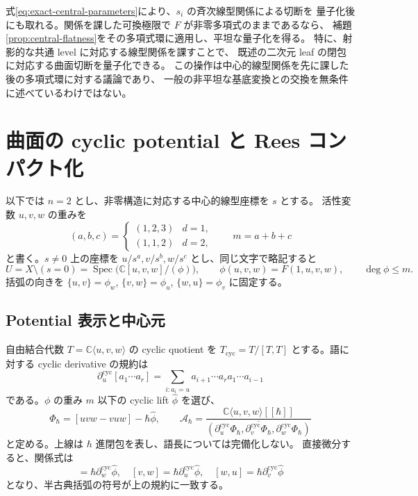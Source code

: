 式\eqref{eq:exact-central-parameters}により、$s_i$ の斉次線型関係による切断を
量子化後にも取れる。関係を課した可換極限で $F$ が非零多項式のままであるなら、
補題\ref{prop:central-flatness}をその多項式環に適用し、平坦な量子化を得る。
特に、射影的な共通 level に対応する線型関係を課すことで、
既述の二次元 leaf の閉包に対応する曲面切断を量子化できる。
この操作は中心的線型関係を先に課した後の多項式環に対する議論であり、
一般の非平坦な基底変換との交換を無条件に述べているわけではない。

\section{曲面の cyclic potential と Rees コンパクト化}
\label{sec:surface-potential}

以下では $n=2$ とし、非零構造に対応する中心的線型座標を $s$ とする。
活性変数 $u,v,w$ の重みを
\[
 (a,b,c)=
 \begin{cases}(1,2,3)&d=1,\\(1,1,2)&d=2,\end{cases}
 \qquad m=a+b+c
\]
と書く。$s\ne0$ 上の座標を $u/s^a,v/s^b,w/s^c$ とし、同じ文字で略記すると
\begin{equation}
 U=X\setminus(s=0)=\operatorname{Spec}\bigl(\mathbb C[u,v,w]/(\phi)\bigr),
 \qquad \phi(u,v,w)=F(1,u,v,w),\qquad \deg\phi\leq m.
 \label{eq:affine-surface}
\end{equation}
括弧の向きを
$\{u,v\}=\phi_w$, $\{v,w\}=\phi_u$, $\{w,u\}=\phi_v$ に固定する。

\subsection{Potential 表示と中心元}

自由結合代数 $T=\mathbb C\langle u,v,w\rangle$ の cyclic quotient を
$T_{\mathrm{cyc}}=T/[T,T]$ とする。語に対する cyclic derivative の規約は
\begin{equation}
 \partial_u^{\mathrm{cyc}}[a_1\cdots a_r]
 =\sum_{i:a_i=u}a_{i+1}\cdots a_r a_1\cdots a_{i-1}
 \label{eq:cyclic-derivative}
\end{equation}
である。$\phi$ の重み $m$ 以下の cyclic lift $\widehat\phi$ を選び、
\begin{equation}
 \Phi_\hbar=[uvw-vuw]-\hbar\widehat\phi,
 \qquad
 \mathcal A_\hbar=
 \frac{\mathbb C\langle u,v,w\rangle[[\hbar]]}
 {\overline{(\partial_u^{\mathrm{cyc}}\Phi_\hbar,
             \partial_v^{\mathrm{cyc}}\Phi_\hbar,
             \partial_w^{\mathrm{cyc}}\Phi_\hbar)}}
 \label{eq:potential-algebra}
\end{equation}
と定める。上線は $\hbar$ 進閉包を表し、語長については完備化しない。
直接微分すると、関係式は
\begin{equation}
 [u,v]=\hbar\partial_w^{\mathrm{cyc}}\widehat\phi,
 \quad[v,w]=\hbar\partial_u^{\mathrm{cyc}}\widehat\phi,
 \quad[w,u]=\hbar\partial_v^{\mathrm{cyc}}\widehat\phi
 \label{eq:potential-relations}
\end{equation}
となり、半古典括弧の符号が上の規約に一致する。

